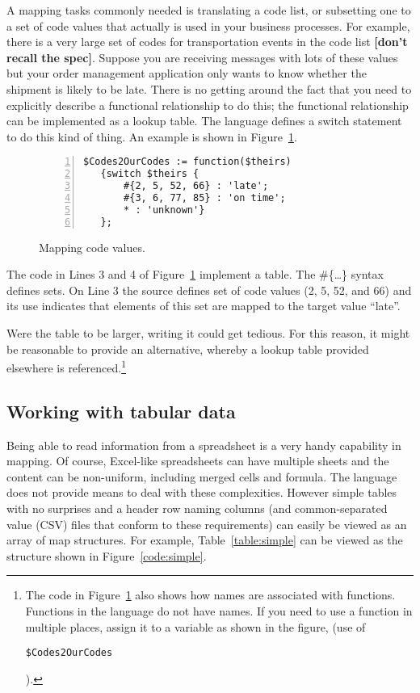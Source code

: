 \documentclass[9pt,letterpaper]{article}
\newcommand{\stt}[1]{\begin{footnotesize}\texttt{#1}\end{footnotesize}}
\begin{document}
A mapping tasks commonly needed is translating a code list, or subsetting one to a set of code values that actually is used in your business processes.
For example, there is a very large set of codes for transportation events in the code list \textbf{[don't recall the spec]}.
Suppose you are receiving messages with lots of these values but your order management application only wants to know whether the shipment is likely to be late.
There is no getting around the fact that you need to explicitly describe a functional relationship to do this; the functional relationship can be implemented as a lookup table. 
The language defines a switch statement to do this kind of thing.
An example is shown in Figure~\ref{code:mapping-codes}.

\begin{figure}[H]
    \caption{Mapping code values.}
    \label{code:mapping-codes}
\begin{lstlisting}[frame=tb,numberstyle=\scriptsize,basicstyle=\ttfamily\scriptsize,numbers=left,stepnumber=1,breaklines=true]
  $Codes2OurCodes := function($theirs) 
   {switch $theirs {
       #{2, 5, 52, 66} : 'late'; 
       #{3, 6, 77, 85} : 'on time';
       * : 'unknown'}
   };
\end{lstlisting}
\end{figure}

The code in Lines 3 and 4 of Figure~\ref{code:mapping-codes} implement a table.
The \#\{\ldots\} syntax defines sets.
On Line 3 the source defines set of code values (2, 5, 52, and 66) and its use indicates that elements of this set are mapped to the target value ``late''.

Were the table to be larger, writing it could get tedious.
For this reason, it might be reasonable to provide an alternative, whereby a lookup table provided elsewhere is referenced.\footnote{The code in Figure~\ref{code:mapping-codes} also
  shows how names are associated with functions.
  Functions in the language do not have names.
  If you need to use a function in multiple places, assign it to a variable as shown in the figure, (use of \stt{\$Codes2OurCodes}).}

\subsection{Working with tabular data}

Being able to read information from a spreadsheet is a very handy capability in mapping.
Of course, Excel-like spreadsheets can have multiple sheets and the content can be non-uniform, including merged cells and formula.
The language does not provide means to deal with these complexities.
However simple tables with no surprises and  a header row naming columns (and common-separated value (CSV) files that conform to these requirements) can easily be viewed as an array of map structures. 
For example, Table~\ref{table:simple} can be viewed as the structure shown in Figure~\ref{code:simple}.
\end{document}
